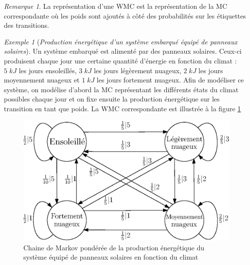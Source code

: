 \documentclass[12pt,a4paper]{report}
\theoremstyle{definition}%
\theoremstyle{remark}
\newtheorem{example}{Exemple}[chapter]
\newtheorem{remark}{Remarque}[chapter]
\begin{document}
\begin{remark}
	La représentation d'une WMC est la représentation de la MC correspondante où les poids sont ajoutés à côté des probabilités sur les étiquettes des transitions.
\end{remark}
\begin{example}[\textit{Production énergétique d'un système embarqué équipé de panneaux solaires}]\label{solar-pannel-example}
	Un système embarqué est alimenté par des panneaux solaires. Ceux-ci produisent chaque jour une certaine quantité d'énergie en fonction du climat : $5\; kJ$ les jours ensoleillés, $3\; kJ$ les jours légèrement nuageux, $2\; kJ$ les jours moyennement nuageux et $1\; kJ$ les jours fortement nuageux. Afin de modéliser ce système, on modélise d'abord la MC représentant les différents états du climat possibles chaque jour et on fixe ensuite la production énergétique sur les transition en tant que poids. La WMC correspondante est illustrée à la figure \ref{solar-pannel-1}
	
	\begin{figure}[H]
		\centering
		\includegraphics[scale=0.9]{figures/weather-solar-pannel.eps}
		\caption{Chaine de Markov pondérée de la production énergétique du système équipé de panneaux solaires en fonction du climat}
		\label{solar-pannel-1}
	\end{figure}
\end{example}
\end{document}
